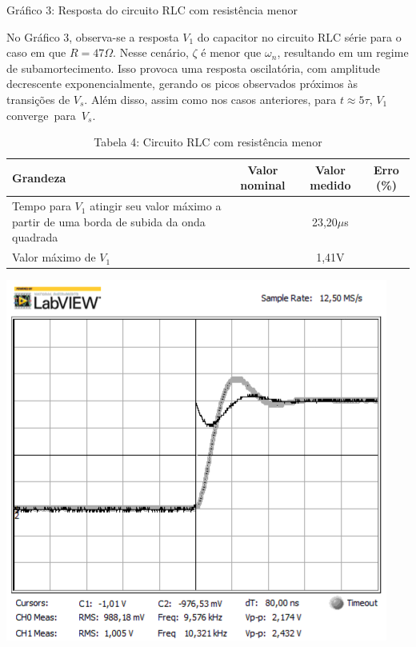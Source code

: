 \documentclass[a4 paper]{article}
\begin{document}
\begin{center}
Gráfico 3: Resposta do circuito RLC com resistência menor
\end{center}

No Gráfico 3, observa-se a resposta $V_1$ do capacitor no circuito RLC série para o caso em que $R=47\Omega$. Nesse cenário, $\zeta$ é menor que $\omega_n$, resultando em um regime de subamortecimento. Isso provoca uma resposta oscilatória, com amplitude decrescente exponencialmente, gerando os picos observados próximos às transições de $V_s$. Além disso, assim como nos casos anteriores, para $t\approx5\tau$, $V_1$ converge para $V_s.$

\vspace{5pt}
\begin{table}[hb]
\centering
\begin{tabular}{|p{5cm}|c|c|c|}
\hline
Grandeza & Valor nominal & Valor medido & Erro (\%) \\\hline
Tempo para $V_1$ atingir seu valor máximo a partir de uma borda de subida da onda quadrada &  & 23,20$\mu$s & \\    \hline
\centering Valor máximo de $V_1$ &  & 1,41V & \\    \hline
\end{tabular}
\caption*{Tabela 4: Circuito RLC com resistência menor}
\end{table}

\newpage
\begin{table}[h]
\centering
\includegraphics[scale=0.6]{rgadicoas/rgadicoa4}
\end{table}
\end{document}
